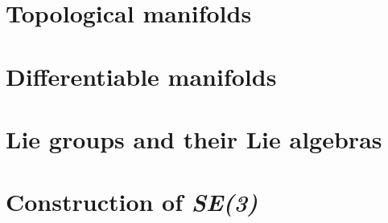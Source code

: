 \documentclass[root.tex]{subfiles}
\begin{document}
\chapter{Topological manifolds}%


\chapter{Differentiable manifolds}%


\chapter{Lie groups and their Lie algebras}%


\chapter{Construction of \emph{SE(3)}}%


\end{document}
